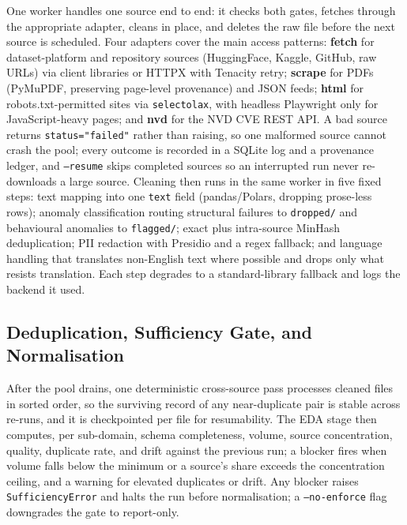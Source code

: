 \documentclass[conference]{IEEEtran}
\begin{document}
One worker handles one source end to end: it checks both gates, fetches
through the appropriate adapter, cleans in place, and deletes the raw
file before the next source is scheduled. Four adapters cover the main
access patterns: \textbf{fetch} for dataset-platform and repository sources
(HuggingFace, Kaggle, GitHub, raw URLs) via client libraries or HTTPX
with Tenacity retry; \textbf{scrape} for PDFs (PyMuPDF, preserving
page-level provenance) and JSON feeds; \textbf{html} for
robots.txt-permitted sites via \texttt{selectolax}, with headless
Playwright only for JavaScript-heavy pages; and \textbf{nvd} for the NVD
CVE REST API. A bad source returns \texttt{status="failed"} rather than
raising, so one malformed source cannot crash the pool; every outcome is
recorded in a SQLite log and a provenance ledger, and \texttt{--resume}
skips completed sources so an interrupted run never re-downloads a large
source. Cleaning then runs in the same worker in five fixed steps: text
mapping into one \texttt{text} field (pandas/Polars, dropping prose-less
rows); anomaly classification routing structural failures to
\texttt{dropped/} and behavioural anomalies to \texttt{flagged/}; exact
plus intra-source MinHash deduplication; PII redaction with Presidio
\cite{presidio2023} and a regex fallback; and language handling that
translates non-English text where possible and drops only what resists
translation. Each step degrades to a standard-library fallback and logs
the backend it used.

\subsection{Deduplication, Sufficiency Gate, and Normalisation}

After the pool drains, one deterministic cross-source pass processes
cleaned files in sorted order, so the surviving record of any
near-duplicate pair is stable across re-runs, and it is checkpointed per
file for resumability. The EDA stage then computes, per sub-domain,
schema completeness, volume, source concentration, quality, duplicate
rate, and drift against the previous run; a blocker fires when volume
falls below the minimum or a source's share exceeds the concentration
ceiling, and a warning for elevated duplicates or drift. Any blocker
raises \texttt{SufficiencyError} and halts the run before
normalisation; a \texttt{--no-enforce} flag downgrades the gate to
report-only.
\end{document}
